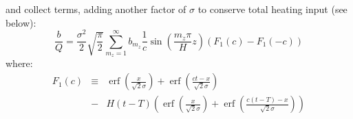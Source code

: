 \documentclass[12pt]{article}
\DeclareMathOperator\erf {erf}
\begin{document}
%
and collect terms, adding another factor of $\sigma$ to conserve total heating input (see below):
%
\begin{equation}
\frac{b}{Q}  = \frac{\sigma^2}{2} \sqrt{ \frac{\pi}{2} } \sum_{m_z = 1}^{\infty} b_{m_z} \frac{1}{ c }\sin \left( \frac{m_z \pi} {H} z\right) \left( F_1 (c) - F_1 (-c) \right) 
\end{equation}
%
where:
%
\begin{eqnarray}
F_1(c)  & \equiv & \erf \left( \frac{x}{\sqrt{2} \sigma} \right) +  \erf \left( \frac{ct-x}{\sqrt{2} \sigma} \right) \\ \nonumber
& - &  H(t-T) \left( \erf \left( \frac{x}{\sqrt{2} \sigma} \right) +  \erf \left( \frac{c(t-T)-x}{\sqrt{2} \sigma} \right)    \right) \\ \nonumber
\end{eqnarray}
%
%
%
\end{document}

